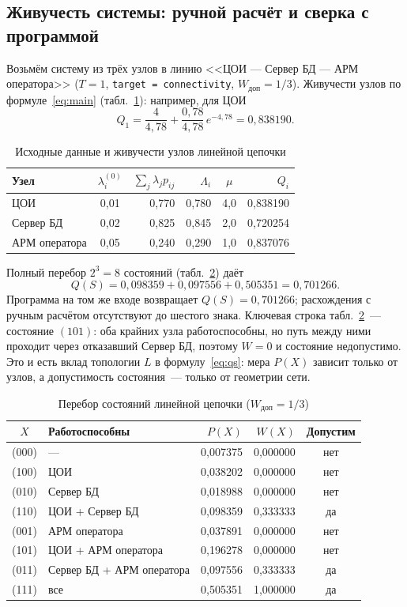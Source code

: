 \documentclass[12pt]{article}
\begin{document}
\subsection{Живучесть системы: ручной расчёт и сверка с программой}

Возьмём систему из трёх узлов в линию <<ЦОИ --- Сервер БД --- АРМ
оператора>> ($T = 1$, \texttt{target = connectivity}, $W_{\text{доп}} =
1/3$). Живучести узлов по формуле~\eqref{eq:main} (табл.~\ref{tab:nodes}):
например, для ЦОИ
\[
Q_1 = \frac{4}{4{,}78} + \frac{0{,}78}{4{,}78}\, e^{-4{,}78}
    = 0{,}838190.
\]

\begin{table}[htb]
\centering
\caption{Исходные данные и живучести узлов линейной цепочки}
\label{tab:nodes}
\begin{tabular}{@{}lcrrcr@{}}
\toprule
Узел & $\lambda_i^{(0)}$ & $\sum_j \lambda_j p_{ij}$ & $\Lambda_i$ &
$\mu$ & $Q_i$ \\
\midrule
ЦОИ & 0{,}01 & 0{,}770 & 0{,}780 & 4{,}0 & 0{,}838190 \\
Сервер БД & 0{,}02 & 0{,}825 & 0{,}845 & 2{,}0 & 0{,}720254 \\
АРМ оператора & 0{,}05 & 0{,}240 & 0{,}290 & 1{,}0 & 0{,}837076 \\
\bottomrule
\end{tabular}
\end{table}

Полный перебор $2^3 = 8$ состояний (табл.~\ref{tab:states}) даёт
\[
Q(S) = 0{,}098359 + 0{,}097556 + 0{,}505351 = 0{,}701266.
\]
Программа на том же входе возвращает $Q(S) = 0{,}701266$; расхождения с
ручным расчётом отсутствуют до шестого знака. Ключевая строка
табл.~\ref{tab:states}~--- состояние $(101)$: оба крайних узла
работоспособны, но путь между ними проходит через отказавший Сервер БД,
поэтому $W = 0$ и состояние недопустимо. Это и есть вклад топологии $L$
в формулу~\eqref{eq:qs}: мера $P(X)$ зависит только от узлов, а
допустимость состояния~--- только от геометрии сети.

\begin{table}[htb]
\centering
\caption{Перебор состояний линейной цепочки ($W_{\text{доп}} = 1/3$)}
\label{tab:states}
\begin{tabular}{@{}clrrc@{}}
\toprule
$X$ & Работоспособны & $P(X)$ & $W(X)$ & Допустим \\
\midrule
(000) & --- & 0{,}007375 & 0{,}000000 & нет \\
(100) & ЦОИ & 0{,}038202 & 0{,}000000 & нет \\
(010) & Сервер БД & 0{,}018988 & 0{,}000000 & нет \\
(110) & ЦОИ + Сервер БД & 0{,}098359 & 0{,}333333 & да \\
(001) & АРМ оператора & 0{,}037891 & 0{,}000000 & нет \\
(101) & ЦОИ + АРМ оператора & 0{,}196278 & 0{,}000000 & нет \\
(011) & Сервер БД + АРМ оператора & 0{,}097556 & 0{,}333333 & да \\
(111) & все & 0{,}505351 & 1{,}000000 & да \\
\bottomrule
\end{tabular}
\end{table}
\end{document}
